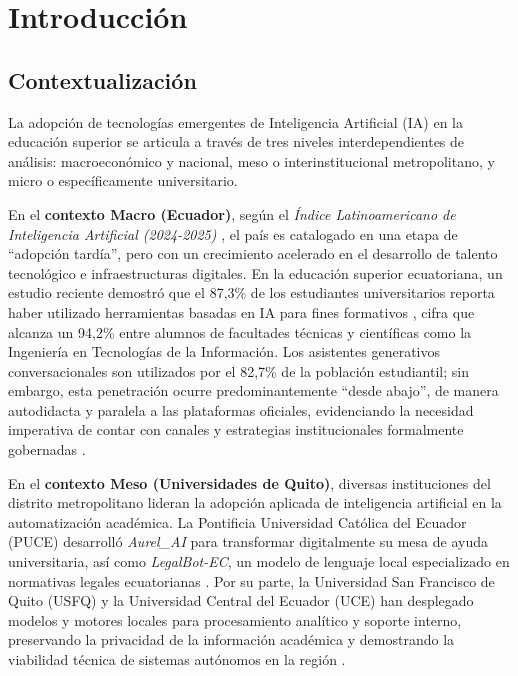 \chapter{Introducción}
\label{chap:introduccion}

\section{Contextualización}

La adopción de tecnologías emergentes de Inteligencia Artificial (IA) en la educación superior se articula a través de tres niveles interdependientes de análisis: macroeconómico y nacional, meso o interinstitucional metropolitano, y micro o específicamente universitario.

En el \textbf{contexto Macro (Ecuador)}, según el \textit{Índice Latinoamericano de Inteligencia Artificial (2024-2025)} \cite{ilia2024ecuador}, el país es catalogado en una etapa de ``adopción tardía'', pero con un crecimiento acelerado en el desarrollo de talento tecnológico e infraestructuras digitales. En la educación superior ecuatoriana, un estudio reciente demostró que el 87,3\% de los estudiantes universitarios reporta haber utilizado herramientas basadas en IA para fines formativos \cite{wiseguyreports2025}, cifra que alcanza un 94,2\% entre alumnos de facultades técnicas y científicas como la Ingeniería en Tecnologías de la Información. Los asistentes generativos conversacionales son utilizados por el 82,7\% de la población estudiantil; sin embargo, esta penetración ocurre predominantemente ``desde abajo'', de manera autodidacta y paralela a las plataformas oficiales, evidenciando la necesidad imperativa de contar con canales y estrategias institucionales formalmente gobernadas \cite{unescoin2024}.

En el \textbf{contexto Meso (Universidades de Quito)}, diversas instituciones del distrito metropolitano lideran la adopción aplicada de inteligencia artificial en la automatización académica. La Pontificia Universidad Católica del Ecuador (PUCE) desarrolló \textit{Aurel\_AI} para transformar digitalmente su mesa de ayuda universitaria, así como \textit{LegalBot-EC}, un modelo de lenguaje local especializado en normativas legales ecuatorianas \cite{puce2024aurel}. Por su parte, la Universidad San Francisco de Quito (USFQ) y la Universidad Central del Ecuador (UCE) han desplegado modelos y motores locales para procesamiento analítico y soporte interno, preservando la privacidad de la información académica y demostrando la viabilidad técnica de sistemas autónomos en la región \cite{ilia2024ecuador}.

